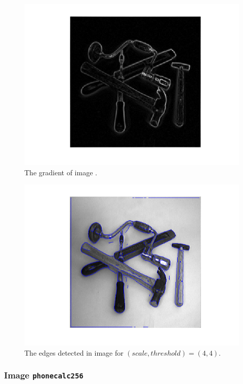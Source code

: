     \begin{figure}[H]
      \centering
      \includegraphics[scale=0.8]{./images/Q8/few256/3.png}
      \caption{The gradient of image .}
      \label{fig:Q8_few256_3}
    \end{figure}

    \begin{figure}[H]
      \centering
      \includegraphics[scale=0.8]{./images/Q8/few256/4.png}
      \caption{The edges detected in image  for
        $(scale, threshold) = (4,4)$.}
      \label{fig:Q8_few256_4}
    \end{figure}


  \subsubsection{Image \texttt{phonecalc256}}

